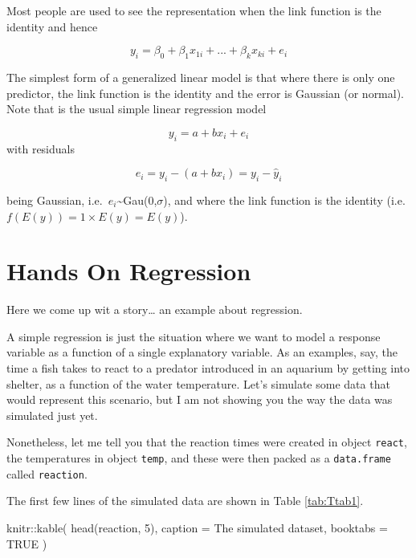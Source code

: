 \documentclass[
]{book}
\newenvironment{Shaded}{\begin{snugshade}}{\end{snugshade}}
\newcommand{\AttributeTok}[1]{\textcolor[rgb]{0.77,0.63,0.00}{#1}}
\newcommand{\ConstantTok}[1]{\textcolor[rgb]{0.00,0.00,0.00}{#1}}
\newcommand{\DecValTok}[1]{\textcolor[rgb]{0.00,0.00,0.81}{#1}}
\newcommand{\FunctionTok}[1]{\textcolor[rgb]{0.00,0.00,0.00}{#1}}
\newcommand{\NormalTok}[1]{#1}
\newcommand{\SpecialCharTok}[1]{\textcolor[rgb]{0.00,0.00,0.00}{#1}}
\newcommand{\StringTok}[1]{\textcolor[rgb]{0.31,0.60,0.02}{#1}}
\begin{document}
Most people are used to see the representation when the link function is the identity and hence

\[ y_i =  \beta_0+\beta_1 x_{1i} + ... + \beta_k x_{ki} + e_i \]

The simplest form of a generalized linear model is that where there is only one predictor, the link function is the identity and the error is Gaussian (or normal). Note that is the usual simple linear regression model

\[y_i=a+bx_i+e_i\]
with residuals

\[e_i=y_i - (a+bx_i)= y_i-\hat y_i\]

being Gaussian, i.e.~\(e_i\)\textasciitilde Gau(0,\(\sigma\)), and where the link function is the identity (i.e.~\(f(E(y))=1 \times E(y)=E(y)\)).

\hypertarget{handson}{%
\chapter{Hands On Regression}\label{handson}}

Here we come up wit a story\ldots{} an example about regression.

A simple regression is just the situation where we want to model a response variable as a function of a single explanatory variable. As an examples, say, the time a fish takes to react to a predator introduced in an aquarium by getting into shelter, as a function of the water temperature. Let's simulate some data that would represent this scenario, but I am not showing you the way the data was simulated just yet.

Nonetheless, let me tell you that the reaction times were created in object \texttt{react}, the temperatures in object \texttt{temp}, and these were then packed as a \texttt{data.frame} called \texttt{reaction}.

The first few lines of the simulated data are shown in Table \ref{tab:Ttab1}.

\begin{Shaded}
\begin{Highlighting}[]
\NormalTok{knitr}\SpecialCharTok{::}\FunctionTok{kable}\NormalTok{(}
  \FunctionTok{head}\NormalTok{(reaction, }\DecValTok{5}\NormalTok{), }\AttributeTok{caption =} \StringTok{\textquotesingle{}The simulated dataset\textquotesingle{}}\NormalTok{,}
  \AttributeTok{booktabs =} \ConstantTok{TRUE}
\NormalTok{)}
\end{Highlighting}
\end{Shaded}
\end{document}
